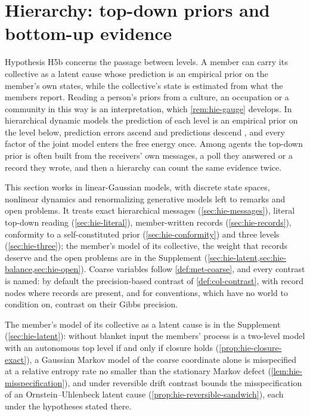 \section{Hierarchy: top-down priors and bottom-up evidence}\label{sec:hie}

Hypothesis H5b concerns the passage between levels. A member can carry its collective as a latent cause whose prediction is an empirical prior on the member's own states, while the collective's state is estimated from what the members report. Reading a person's priors from a culture, an occupation or a community in this way is an interpretation, which \cref{rem:hie-gauge} develops. In hierarchical dynamic models the prediction of each level is an empirical prior on the level below, prediction errors ascend and predictions descend \citep{friston2008hierarchical}, and every factor of the joint model enters the free energy once. Among agents the top-down prior is often built from the receivers' own messages, a poll they answered or a record they wrote, and then a hierarchy can count the same evidence twice.

This section works in linear-Gaussian models, with discrete state spaces, nonlinear dynamics and renormalizing generative models left to remarks and open problems. It treats exact hierarchical messages (\cref{sec:hie-messages}), literal top-down reading (\cref{sec:hie-literal}), member-written records (\cref{sec:hie-records}), conformity to a self-constituted prior (\cref{sec:hie-conformity}) and three levels (\cref{sec:hie-three}); the member's model of its collective, the weight that records deserve and the open problems are in the Supplement (\cref{sec:hie-latent,sec:hie-balance,sec:hie-open}). Coarse variables follow \cref{def:met-coarse}, and every contrast is named: by default the precision-based contrast of \cref{def:col-contrast}, with record nodes where records are present, and for conventions, which have no world to condition on, contrast on their Gibbs precision.

The member's model of its collective as a latent cause is in the Supplement (\cref{sec:hie-latent}): without blanket input the members' process is a two-level model with an autonomous top level if and only if closure holds (\cref{prop:hie-closure-exact}), a Gaussian Markov model of the coarse coordinate alone is misspecified at a relative entropy rate no smaller than the stationary Markov defect (\cref{lem:hie-misspecification}), and under reversible drift contrast bounds the misspecification of an Ornstein--Uhlenbeck latent cause (\cref{prop:hie-reversible-sandwich}), each under the hypotheses stated there.

